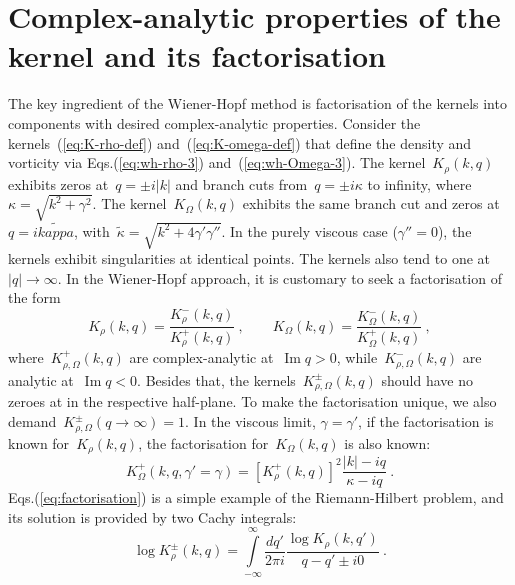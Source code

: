 \documentclass[preprint,aps,eqsecnum]{revtex4-1}
\newcommand{\fplus}[1]{{#1}^{+}}
\newcommand{\fminus}[1]{{#1}^{-}}
\newcommand{\fplusminus}[1]{{#1}^{\pm}}
\renewcommand{\Im}{\mathop{\mathrm{Im}}\nolimits}
\begin{document}
\section{Complex-analytic properties of the kernel and its factorisation}
\label{sec:factorisation}
The key ingredient of the Wiener-Hopf method is factorisation of the kernels
into components with desired complex-analytic properties.
Consider the kernels~(\ref{eq:K-rho-def}) and~(\ref{eq:K-omega-def})
that define the density and vorticity via Eqs.(\ref{eq:wh-rho-3})
and~(\ref{eq:wh-Omega-3}).
The  kernel~$K_\rho(k, q)$ exhibits zeros at~$q = \pm i |k|$ and branch cuts
from~$q = \pm i \kappa$ to infinity, where~$\kappa = \sqrt{k^2 + \gamma^2}$.
The kernel~$K_\Omega(k, q)$ exhibits the same branch cut
and zeros at~$q = i \tilde{kappa}$,
with~${\tilde\kappa} = \sqrt{k^2 + 4 \gamma'\gamma''} $.
In the purely viscous case ($\gamma'' = 0$), the kernels exhibit
singularities at identical points.
The kernels also
tend to one at~$|q| \to \infty$. In the Wiener-Hopf approach, it is
customary to seek a factorisation of the form
\begin{equation}
  \label{eq:factorisation}
  K_\rho(k, q) = \frac{\fminus{K}_\rho(k, q)}{\fplus{K}_\rho(k, q)}
  \ ,
  \qquad
  K_\Omega(k, q) = \frac{\fminus{K}_\Omega(k, q)}{\fplus{K}_\Omega(k, q)}
  \ ,
\end{equation}
where~$\fplus{K}_{\rho, \Omega}(k, q)$ are complex-analytic at~$\Im q > 0$,
while~$\fminus{K}_{\rho, \Omega}(k, q)$ are analytic at~$\Im q < 0$.
Besides that, the kernels~$\fplusminus{K}_{\rho, \Omega}(k, q)$ should have no
zeroes at in the respective half-plane.
To make the factorisation unique, we also
demand~$\fplusminus{K}_{\rho, \Omega}(q\to \infty) = 1$.
In the viscous limit, $\gamma = \gamma'$,
if the factorisation is known for~$K_\rho(k, q)$,
 the factorisation for~$K_\Omega(k, q)$ is also known:
\begin{equation}
  \fplus{K}_\Omega(k, q, \gamma'=\gamma) = \left[\fplus{K}_\rho(k, q)\right]^2
                              \frac{|k| - iq}{\kappa - iq}
  \ .
\end{equation}
Eqs.(\ref{eq:factorisation})  is  a simple example of
the Riemann-Hilbert problem, and its solution is provided by two Cachy integrals:
\begin{equation}
  \label{eq:factor-cauchy}
  \log\fplusminus{K}_\rho(k, q)
  = \int\limits_{-\infty}^{\infty} \frac{dq'}{2\pi i}
    \frac{\log K_\rho(k, q') }{q - q' \pm i0}
  \ .
\end{equation}
\end{document}
